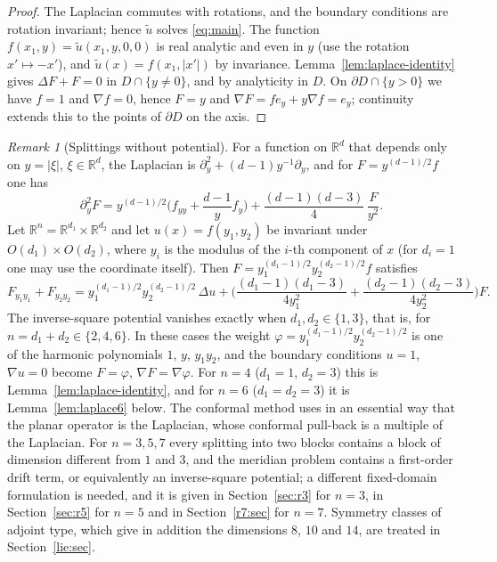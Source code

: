 \documentclass[11pt]{amsart}
\theoremstyle{definition}
\theoremstyle{remark}
\newtheorem{remark}[theorem]{Remark}
\numberwithin{equation}{section}
\newcommand{\R}{\mathbb{R}}
\begin{document}
\begin{proof}
The Laplacian commutes with rotations, and the boundary conditions are rotation invariant; hence $\tilde u$ solves \eqref{eq:main}. The function $f(x_1,y)=\tilde u(x_1,y,0,0)$ is real analytic and even in $y$ (use the rotation $x'\mapsto-x'$), and $\tilde u(x)=f(x_1,|x'|)$ by invariance. Lemma~\ref{lem:laplace-identity} gives $\Delta F+F=0$ in $D\cap\{y\neq0\}$, and by analyticity in $D$. On $\partial D\cap\{y>0\}$ we have $f=1$ and $\nabla f=0$, hence $F=y$ and $\nabla F=f e_y+y\nabla f=e_y$; continuity extends this to the points of $\partial D$ on the axis.
\end{proof}

\begin{remark}[Splittings without potential]\label{rem:why4}
For a function on $\R^d$ that depends only on $y=|\xi|$, $\xi\in\R^d$, the Laplacian is $\partial_y^2+(d-1)y^{-1}\partial_y$, and for $F=y^{(d-1)/2}f$ one has
\[
\partial_y^2F=y^{(d-1)/2}\Big(f_{yy}+\frac{d-1}{y}f_y\Big)+\frac{(d-1)(d-3)}{4}\,\frac{F}{y^2}.
\]
Let $\R^n=\R^{d_1}\times\R^{d_2}$ and let $u(x)=f(y_1,y_2)$ be invariant under $O(d_1)\times O(d_2)$, where $y_i$ is the modulus of the $i$-th component of $x$ (for $d_i=1$ one may use the coordinate itself). Then $F=y_1^{(d_1-1)/2}y_2^{(d_2-1)/2}f$ satisfies
\[
F_{y_1y_1}+F_{y_2y_2}=y_1^{(d_1-1)/2}y_2^{(d_2-1)/2}\,\Delta u+\Big(\frac{(d_1-1)(d_1-3)}{4y_1^2}+\frac{(d_2-1)(d_2-3)}{4y_2^2}\Big)F .
\]
The inverse-square potential vanishes exactly when $d_1,d_2\in\{1,3\}$, that is, for $n=d_1+d_2\in\{2,4,6\}$. In these cases the weight $\varphi=y_1^{(d_1-1)/2}y_2^{(d_2-1)/2}$ is one of the harmonic polynomials $1$, $y$, $y_1y_2$, and the boundary conditions $u=1$, $\nabla u=0$ become $F=\varphi$, $\nabla F=\nabla\varphi$. For $n=4$ ($d_1=1$, $d_2=3$) this is Lemma~\ref{lem:laplace-identity}, and for $n=6$ ($d_1=d_2=3$) it is Lemma~\ref{lem:laplace6} below. The conformal method uses in an essential way that the planar operator is the Laplacian, whose conformal pull-back is a multiple of the Laplacian. For $n=3,5,7$ every splitting into two blocks contains a block of dimension different from $1$ and $3$, and the meridian problem contains a first-order drift term, or equivalently an inverse-square potential; a different fixed-domain formulation is needed, and it is given in Section~\ref{sec:r3} for $n=3$, in Section~\ref{sec:r5} for $n=5$ and in Section~\ref{r7:sec} for $n=7$. Symmetry classes of adjoint type, which give in addition the dimensions $8$, $10$ and $14$, are treated in Section~\ref{lie:sec}.
\end{remark}
\end{document}
